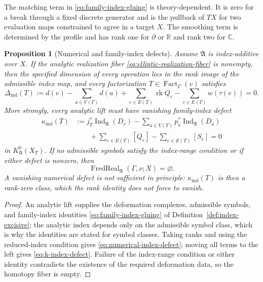 \documentclass[11pt,letterpaper,twoside]{article}
\theoremstyle{plain}
\newtheorem{proposition}[theorem]{Proposition}
\theoremstyle{definition}
\theoremstyle{remark}
\newcommand{\Ind}{\operatorname{Ind}}
\DeclareMathOperator{\Fact}{Fact}
\begin{document}
The matching term in \eqref{eq:family-index-gluing} is theory-dependent.  It is zero for a break through a fixed discrete generator and is the pullback of $TX$ for two evaluation maps constrained to agree in a target $X$.  The smoothing term is determined by the profile and has rank one for $\partial$ or $\mathbb R$ and rank two for $\mathbb C$.

\begin{proposition}[Numerical and family-index defects]\label{prop:symbol-index}
Assume $\mathfrak A$ is index-additive over $X$.  If the analytic realization fiber \eqref{eq:elliptic-realization-fiber} is nonempty, then the specified dimension of every operation lies in the rank image of the admissible index map, and every factorization $T\in\Fact_\Gamma(v)$ satisfies
\begin{equation}\label{eq:numerical-index-defect}
 \Delta_{\mathrm{ind}}(T)
 :=d(v)-\sum_{a\in V(T)}d(a)
 +\sum_{e\in E(T)}\operatorname{rk}Q_e
 -\sum_{e\in E(T)}w(\tau(e))
 =0.
\end{equation}
More strongly, every analytic lift must have vanishing family-index defect
\begin{equation}\label{eq:k-index-defect}
\begin{aligned}
 \kappa_{\mathrm{ind}}(T)
 &:={}j_T^*\Ind_{\mathfrak A}(D_v)
 -\sum_{a\in V(T)}p_a^*\Ind_{\mathfrak A}(D_a)\\
 &\hspace{2em}{}
 +\sum_{e\in E(T)}[Q_e]
 -\sum_{e\in E(T)}[S_e]
 =0
\end{aligned}
\end{equation}
in $K^0_{\mathfrak A}(X_T)$.  If no admissible symbols satisfy the index-range condition or if either defect is nonzero, then
\[
 \operatorname{FredReal}_{\mathfrak A}(\Gamma,\nu;X)=\varnothing.
\]
A vanishing numerical defect is not sufficient in principle: \(\kappa_{\mathrm{ind}}(T)\) is then a rank-zero class, which the rank identity does not force to vanish.
\end{proposition}

\begin{proof}
An analytic lift supplies the deformation complexes, admissible symbols, and family-index identities \eqref{eq:family-index-gluing} of Definition~\ref{def:index-excisive}; the analytic index depends only on the admissible symbol class, which is why the identities are stated for symbol classes.  Taking ranks and using the reduced-index condition gives \eqref{eq:numerical-index-defect}; moving all terms to the left gives \eqref{eq:k-index-defect}.  Failure of the index-range condition or either identity contradicts the existence of the required deformation data, so the homotopy fiber is empty.
\end{proof}
\end{document}
